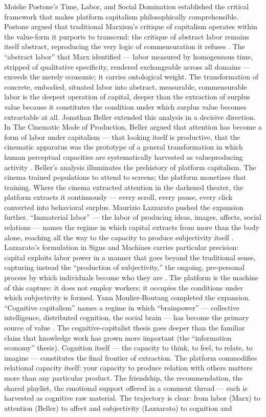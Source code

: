Moishe Postone’s Time, Labor, and Social Domination established the critical framework that makes platform capitalism philosophically comprehensible. Postone argued that traditional Marxism’s critique of capitalism operates within the value-form it purports to transcend: the critique of abstract labor remains itself abstract, reproducing the very logic of commensuration it refuses \cite[pp.~5--27]{postone_1993}. The “abstract labor” that Marx identified — labor measured by homogeneous time, stripped of qualitative specificity, rendered exchangeable across all domains — exceeds the merely economic; it carries ontological weight. The transformation of concrete, embodied, situated labor into abstract, measurable, commensurable labor is the deepest operation of capital, deeper than the extraction of surplus value because it constitutes the condition under which surplus value becomes extractable at all. Jonathan Beller extended this analysis in a decisive direction. In The Cinematic Mode of Production, Beller argued that attention has become a form of labor under capitalism — that looking itself is productive, that the cinematic apparatus was the prototype of a general transformation in which human perceptual capacities are systematically harvested as valueproducing activity \cite{beller_2006}. Beller’s analysis illuminates the prehistory of platform capitalism. The cinema trained populations to attend to screens; the platform monetizes that training. Where the cinema extracted attention in the darkened theater, the platform extracts it continuously — every scroll, every pause, every click converted into behavioral surplus. Maurizio Lazzarato pushed the expansion further. “Immaterial labor” — the labor of producing ideas, images, affects, social relations — names the regime in which capital extracts from more than the body alone, reaching all the way to the capacity to produce subjectivity itself \cite{lazzarato_2014}. Lazzarato’s formulation in Signs and Machines carries particular precision: capital exploits labor power in a manner that goes beyond the traditional sense, capturing instead the “production of subjectivity,” the ongoing, pre-personal process by which individuals become who they are \cite[pp.~23--45]{lazzarato_2014}. The platform is the machine of this capture: it does not employ workers; it occupies the conditions under which subjectivity is formed. Yann Moulier-Boutang completed the expansion. “Cognitive capitalism” names a regime in which “brainpower” — collective intelligence, distributed cognition, the social brain — has become the primary source of value \cite{moulier-boutang_2011}. The cognitive-capitalist thesis goes deeper than the familiar claim that knowledge work has grown more important (the “information economy” thesis). Cognition itself — the capacity to think, to feel, to relate, to imagine — constitutes the final frontier of extraction. The platform commodifies relational capacity itself: your capacity to produce relation with others matters more than any particular product. The friendship, the recommendation, the shared playlist, the emotional support offered in a comment thread — each is harvested as cognitive raw material. The trajectory is clear: from labor (Marx) to attention (Beller) to affect and subjectivity (Lazzarato) to cognition and 